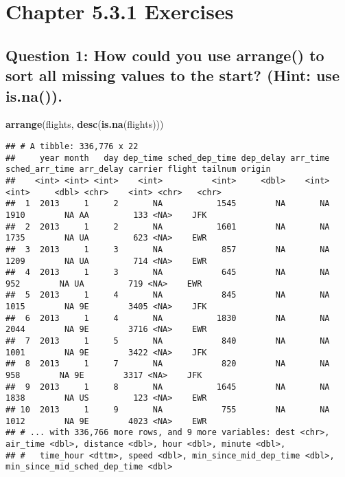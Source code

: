 \documentclass[
]{book}
\newenvironment{Shaded}{\begin{snugshade}}{\end{snugshade}}
\newcommand{\KeywordTok}[1]{\textcolor[rgb]{0.13,0.29,0.53}{\textbf{#1}}}
\newcommand{\NormalTok}[1]{#1}
\begin{document}
\hypertarget{chapter-5.3.1-exercises}{%
\section{Chapter 5.3.1 Exercises}\label{chapter-5.3.1-exercises}}

\hypertarget{question-1-how-could-you-use-arrange-to-sort-all-missing-values-to-the-start-hint-use-is.na.}{%
\subsection{Question 1: How could you use arrange() to sort all missing values to the start? (Hint: use is.na()).}\label{question-1-how-could-you-use-arrange-to-sort-all-missing-values-to-the-start-hint-use-is.na.}}

\begin{Shaded}
\begin{Highlighting}[]
\KeywordTok{arrange}\NormalTok{(flights, }\KeywordTok{desc}\NormalTok{(}\KeywordTok{is.na}\NormalTok{(flights)))}
\end{Highlighting}
\end{Shaded}

\begin{verbatim}
## # A tibble: 336,776 x 22
##     year month   day dep_time sched_dep_time dep_delay arr_time sched_arr_time arr_delay carrier flight tailnum origin
##    <int> <int> <int>    <int>          <int>     <dbl>    <int>          <int>     <dbl> <chr>    <int> <chr>   <chr> 
##  1  2013     1     2       NA           1545        NA       NA           1910        NA AA         133 <NA>    JFK   
##  2  2013     1     2       NA           1601        NA       NA           1735        NA UA         623 <NA>    EWR   
##  3  2013     1     3       NA            857        NA       NA           1209        NA UA         714 <NA>    EWR   
##  4  2013     1     3       NA            645        NA       NA            952        NA UA         719 <NA>    EWR   
##  5  2013     1     4       NA            845        NA       NA           1015        NA 9E        3405 <NA>    JFK   
##  6  2013     1     4       NA           1830        NA       NA           2044        NA 9E        3716 <NA>    EWR   
##  7  2013     1     5       NA            840        NA       NA           1001        NA 9E        3422 <NA>    JFK   
##  8  2013     1     7       NA            820        NA       NA            958        NA 9E        3317 <NA>    JFK   
##  9  2013     1     8       NA           1645        NA       NA           1838        NA US         123 <NA>    EWR   
## 10  2013     1     9       NA            755        NA       NA           1012        NA 9E        4023 <NA>    EWR   
## # ... with 336,766 more rows, and 9 more variables: dest <chr>, air_time <dbl>, distance <dbl>, hour <dbl>, minute <dbl>,
## #   time_hour <dttm>, speed <dbl>, min_since_mid_dep_time <dbl>, min_since_mid_sched_dep_time <dbl>
\end{verbatim}
\end{document}
